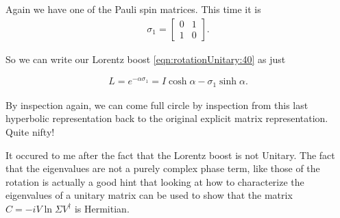 Again we have one of the Pauli spin matrices.  This time it is
\begin{align}\label{eqn:rotationUnitary:42}
\sigma_1 =
\begin{bmatrix}
0 & 1 \\
1 & 0 
\end{bmatrix}.
\end{align}

So we can write our Lorentz boost \ref{eqn:rotationUnitary:40} as just

\begin{align}\label{eqn:rotationUnitary:43}
L = e^{-\alpha \sigma_1} = I \cosh\alpha - \sigma_1 \sinh\alpha.
\end{align}

By inspection again, we can come full circle by inspection from this last hyperbolic representation back to the original explicit matrix representation.  Quite nifty!

It occured to me after the fact that the Lorentz boost is not Unitary.  The fact that the eigenvalues are not a purely complex phase term, like those of the rotation is actually a good hint that looking at how to characterize the eigenvalues of a unitary matrix can be used to show that the matrix $C = -i V \ln \Sigma V^\dagger$ is Hermitian.

\EndArticle

